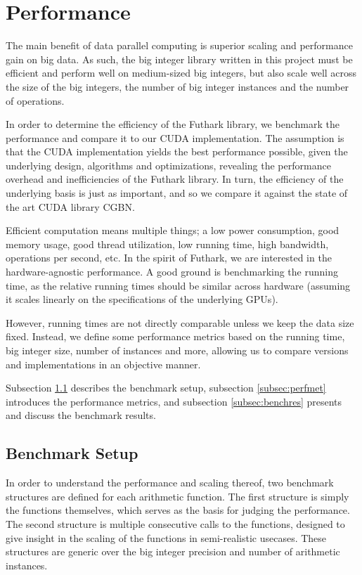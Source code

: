 \section{Performance}
\label{sec:per}

The main benefit of data parallel computing is superior scaling and performance
gain on big data. As such, the big integer library written in this project must
be efficient and perform well on medium-sized big integers, but also scale well
across the size of the big integers, the number of big integer instances and the
number of operations.

In order to determine the efficiency of the Futhark library, we benchmark the
performance and compare it to our CUDA implementation. The assumption is that
the CUDA implementation yields the best performance possible, given the
underlying design, algorithms and optimizations, revealing the performance
overhead and inefficiencies of the Futhark library. In turn, the efficiency of
the underlying basis is just as important, and so we compare it against the
state of the art CUDA library CGBN.

Efficient computation means multiple things; a low power consumption, good
memory usage, good thread utilization, low running time, high bandwidth,
operations per second, etc. In the spirit of Futhark, we are interested in the
hardware-agnostic performance. A good ground is benchmarking the running time,
as the relative running times should be similar across hardware (assuming it
scales linearly on the specifications of the underlying GPUs).

However, running times are not directly comparable unless we keep the data size
fixed. Instead, we define some performance metrics based on the running time,
big integer size, number of instances and more, allowing us to compare versions
and implementations in an objective manner.

Subsection \ref{subsec:benchset} describes the benchmark setup, subsection
\ref{subsec:perfmet} introduces the performance metrics, and subsection
\ref{subsec:benchres} presents and discuss the benchmark results.

\subsection{Benchmark Setup}
\label{subsec:benchset}

In order to understand the performance and scaling thereof, two benchmark
structures are defined for each arithmetic function. The first structure is
simply the functions themselves, which serves as the basis for judging the
performance. The second structure is multiple consecutive calls to the
functions, designed to give insight in the scaling of the functions in
semi-realistic usecases. These structures are generic over the big integer
precision and number of arithmetic instances.

